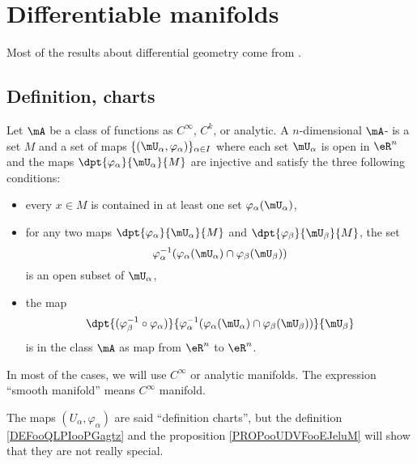 
\section{Differentiable manifolds}

Most of the results about differential geometry come from \cite{kobayashi, madore, Helgason, ms_book, dgbook}.

\subsection{Definition, charts}

\begin{definition}
    Let \( \mA\) be a class of functions as \(  C^{\infty}\), \( C^k\), or analytic. A $n$-dimensional \( \mA\)- is a set $M$ and a set of maps $\{(\mU_{\alpha},\varphi_{\alpha})\}_{\alpha\in I}$ where each set $\mU_{\alpha}$ is open in $\eR^n$ and the maps $\dpt{\varphi_{\alpha}}{\mU_{\alpha}}{M}$ are injective and satisfy the three following conditions:

    \begin{itemize}
    \item every $x\in M$ is contained in at least one set $\varphi_{\alpha}(\mU_{\alpha})$,
    \item for any two maps $\dpt{\varphi_{\alpha}}{\mU_{\alpha}}{M}$ and $\dpt{\varphi_{\beta}}{\mU_{\beta}}{M}$, the set
    \[
       \varphi_{\alpha}^{-1}( \varphi_{\alpha}(\mU_{\alpha})\cap\varphi_{\beta}(\mU_{\beta}) )
    \]
    is an open subset of $\mU_{\alpha}$,
    \item the map
    \[
      \dpt{  (\varphi_{\beta}^{-1}\circ\varphi_{\alpha})  }{   \varphi_{\alpha}^{-1}( \varphi_{\alpha}(\mU_{\alpha})\cap\varphi_{\beta}(\mU_{\beta})  )   }{\mU_{\beta}}
    \]
    is in the class \( \mA\) as map from $\eR^n$ to $\eR^n$.
    \end{itemize}
    In most of the cases, we will use \(  C^{\infty}\) or analytic manifolds. The expression ``smooth manifold'' means \(  C^{\infty}\) manifold.

    The maps \( (U_{\alpha}, \varphi_{\alpha})\) are said ``definition charts'', but the definition \ref{DEFooQLPIooPGagtz} and the proposition \ref{PROPooUDVFooEJeluM} will show that they are not really special.
\end{definition}

